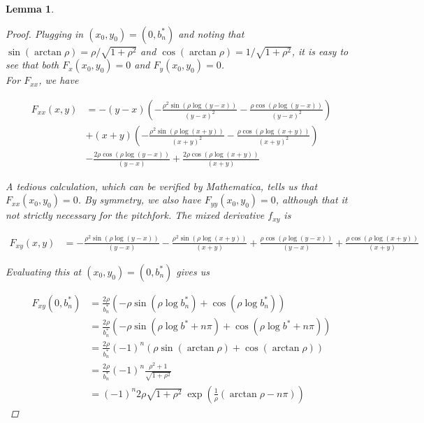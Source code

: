 \documentclass[12pt]{article}
\newtheorem{lemma}{Lemma}
\begin{document}
\begin{lemma}
\begin{proof}
Plugging in $(x_0, y_0) = \left(0, b^*_n \right)$ and noting that $\sin(\arctan \rho) = \rho / \sqrt{1 + \rho^2}$ and $\cos(\arctan \rho) = 1 / \sqrt{1 + \rho^2}$, it is easy to see that both $F_x(x_0, y_0) = 0$ and $F_y(x_0, y_0) = 0$. \\

For $F_{xx}$, we have

\begin{align*}
F_{xx}(x, y) &= 
-(y-x) \left(-\frac{\rho^2 \sin \left(\rho \log (y-x)\right)}{(y-x)^2}-\frac{\rho
   \cos \left(\rho \log (y-x) \right)}{(y-x)^2}\right)\\
   &+(x+y) \left(-\frac{\rho^2
   \sin \left(\rho \log (x+y)\right)}{(x+y)^2}-\frac{\rho \cos \left( \rho
   \log (x+y)\right)}{(x+y)^2}\right)\\
   &-\frac{2 \rho \cos \left(\rho \log
   (y-x) \right)}{(y-x)}+\frac{2 \rho \cos \left( \rho \log (x+y) \right)}{
   (x+y)}
\end{align*}

A tedious calculation, which can be verified by Mathematica,  tells us that $F_{xx}(x_0, y_0) = 0$. By symmetry, we also have $F_{yy}(x_0, y_0) = 0$, although that it not strictly necessary for the pitchfork. The mixed derivative $f_{xy}$ is

\begin{align*}
F_{xy}(x, y) &= -\frac{\rho^2 \sin \left(\rho \log (y-x)\right)}{(y-x)}-\frac{\rho^2 \sin
   \left(\rho \log (x+y)\right)}{(x+y)}+\frac{\rho \cos \left(\rho \log (y-x)\right)}{(y-x)}+\frac{\rho \cos \left( \rho \log (x+y) \right)}{(x+y)}
\end{align*}

Evaluating this at $(x_0, y_0) = \left(0, b^*_n \right)$ gives us

\begin{align*}
F_{xy}(0, b^*_n) &= \frac{2 \rho}{b_n^*}\left( -\rho \sin \left(\rho \log b_n^*\right) + \cos \left(\rho \log b_n^*\right) \right)\\
&= \frac{2 \rho}{b_n^*}\left( -\rho \sin \left(\rho \log b^* + n \pi \right) + \cos \left(\rho \log b^* + n \pi \right) \right) \\
&= \frac{2 \rho}{b_n^*} (-1)^n \left( \rho \sin \left(\arctan \rho \right) + \cos \left(\arctan \rho \right) \right)\\ 
&= \frac{2 \rho}{b_n^*} (-1)^n \frac{\rho^2 + 1}{\sqrt{1 + \rho^2}} \\
&= (-1)^n 2 \rho \sqrt{1 + \rho^2} \: \exp{\left(\frac{1}{\rho} (\arctan \rho - n \pi) \right)}
\end{align*}


\end{proof}
\end{lemma}
\end{document}
